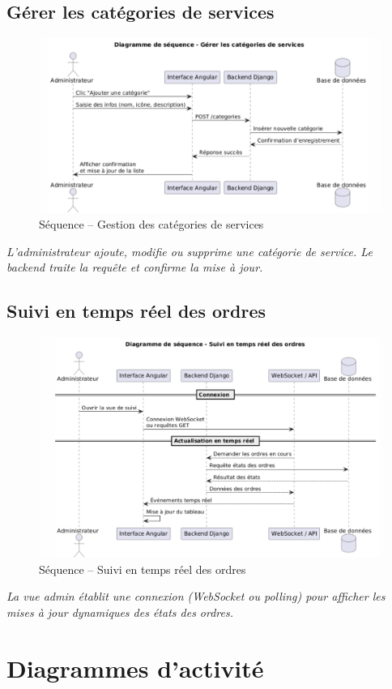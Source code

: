 \subsection*{Gérer les catégories de services}
\begin{figure}[H]
\centering
\includegraphics[width=0.85\linewidth]{figures/gestion des service seq.png}
\caption{Séquence – Gestion des catégories de services}
\end{figure}
\textit{L'administrateur ajoute, modifie ou supprime une catégorie de service. Le backend traite la requête et confirme la mise à jour.}

\subsection*{Suivi en temps réel des ordres}
\begin{figure}[H]
\centering
\includegraphics[width=0.85\linewidth]{figures/suivi des ordres seqq.png}
\caption{Séquence – Suivi en temps réel des ordres}
\end{figure}
\textit{La vue admin établit une connexion (WebSocket ou polling) pour afficher les mises à jour dynamiques des états des ordres.}

\section{Diagrammes d’activité}

